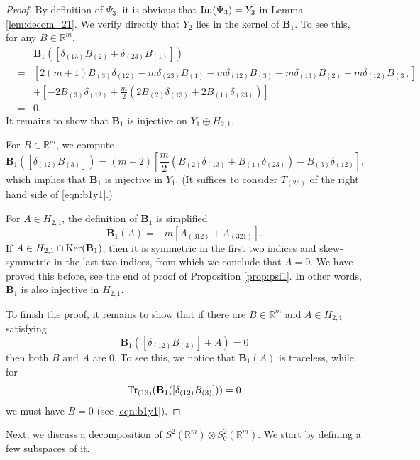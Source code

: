 \documentclass{amsart}
\newcommand{\Real}{\mathbb R}
\numberwithin{equation}{section}
\begin{document}
\begin{proof}
	By definition of $\Psi_3$, it is obvious that ${\rm Im}(\Psi_3)=Y_2$ in Lemma \ref{lem:decom_21}. We verify directly that $Y_2$ lies in the kernel of ${\mathbf B}_1$. To see this, for any $B\in \Real^m$,
	\begin{eqnarray*}
	&& {\mathbf B}_1( [\delta_{(13)}B_{(2)}+\delta_{(23)}B_{(1)}]) \\
	&=& \left[ 2(m+1)B_{(3)}\delta_{(12)}- m \delta_{(23)}B_{(1)}-m \delta_{(12)}B_{(3)} -m\delta_{(13)}B_{(2)}-m\delta_{(12)}B_{(3)} \right] \\
	&& + \left[ - 2B_{(3)}\delta_{(12)} + \frac{m}{2}\left( 2B_{(2)}\delta_{(13)}+ 2B_{(1)}\delta_{(23)} \right)\right] \\
	&=& 0.
	\end{eqnarray*}
	It remains to show that ${\mathbf B}_1$ is injective on $Y_1\oplus H_{2,1}$.

	For $B\in \Real^m$, we compute
	\begin{equation}
		\label{eqn:b1y1}
		{\mathbf B}_1 ([\delta_{(12)}B_{(3)}]) = (m-2)\left[ \frac{m}{2}(B_{(2)}\delta_{(13)}+B_{(1)}\delta_{(23)})-B_{(3)}\delta_{(12)} \right],
	\end{equation}
	which implies that ${\mathbf B}_1$ is injective in $Y_1$. (It suffices to consider $T_{(23)}$ of the right hand side of \eqref{eqn:b1y1}.)

	For $A\in H_{2,1}$, the definition of ${\mathbf B}_1$ is simplified
	\[
		{\mathbf B}_1(A)= -m[A_{(312)}+A_{(321)}].
	\]
	If $A\in H_{2,1}\cap {\rm Ker}({\mathbf B}_1)$, then it is symmetric in the first two indices and skew-symmetric in the last two indices, from which we conclude that $A=0$. We have proved this before, see the end of proof of Proposition \ref{prop:psi1}.
	In other words, ${\mathbf B}_1$ is also injective in $H_{2,1}$. 

	To finish the proof, it remains to show that if there are $B\in \Real^m$ and $A\in H_{2,1}$ satisfying
	\[
		{\mathbf B}_1([\delta_{(12)}B_{(3)}]+A)=0
	\]
	then both $B$ and $A$ are $0$. To see this, we notice that ${\mathbf B}_1(A)$ is traceless, while for 
	\[
		{\rm Tr}_{(13)}( {\mathbf B}_1([\delta_{(12)}B_{(3)}]))=0
	\]
	we must have $B=0$ (see \eqref{eqn:b1y1}).
\end{proof}


Next, we discuss a decomposition of $S^2(\Real^m)\otimes S^2_0(\Real^m)$. We start by defining a few subspaces of it.
\end{document}
